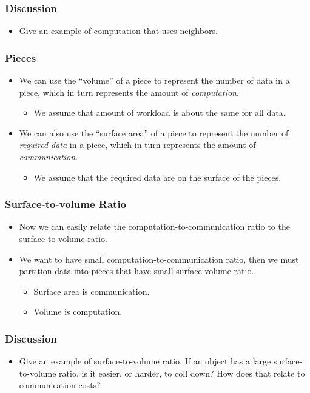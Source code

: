 \documentclass{beamer}
\begin{document}
\begin{CJK}{UTF8}{bsmi}
\begin{frame}
\frametitle{Discussion}
\begin{itemize}
\item Give an example of computation that uses neighbors.
\end{itemize}
\end{frame}

\begin{frame}
\frametitle{Pieces}
\begin{itemize}
\item We can use the ``volume'' of a piece to represent the number of
  data in a piece, which in turn represents the amount of {\em
    computation}.
\begin{itemize}
\item We assume that amount of workload is about the same for all
  data.
\end{itemize}
\item We can also use the ``surface area'' of a piece to represent the
  number of {\em required data} in a piece, which in turn represents
  the amount of {\em communication}.
\begin{itemize}
\item We assume that the required data are on the surface of the
  pieces.
\end{itemize}
\end{itemize}
\end{frame}

\begin{frame}
\frametitle{Surface-to-volume Ratio}
\begin{itemize}
\item Now we can easily relate the computation-to-communication ratio
  to the surface-to-volume ratio.
\item We want to have small computation-to-communication ratio, then
  we must partition data into pieces that have small
  surface-volume-ratio.
\begin{itemize}
\item Surface area is communication.
\item Volume is computation.
\end{itemize}
\end{itemize}
\end{frame}

\begin{frame}
\frametitle{Discussion}
\begin{itemize}
\item Give an example of surface-to-volume ratio.  If an object has a
  large surface-to-volume ratio, is it easier, or harder, to coll
  down?  How does that relate to communication costs?
\end{itemize}
\end{frame}


\end{CJK}
\end{document}
